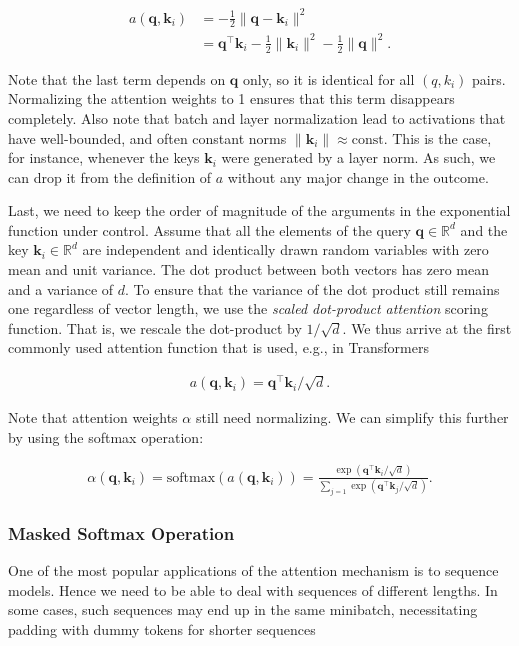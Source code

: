 \documentclass[a4paper,12pt]{article}
\theoremstyle{definition}
\begin{document}
\begin{align*}
    a(\mathbf{q}, \mathbf{k}_i) & = -\frac{1}{2} \|\mathbf{q} - \mathbf{k}_i\|^2                                                 \\
                                & = \mathbf{q}^\top \mathbf{k}_i -\frac{1}{2} \|\mathbf{k}_i\|^2  -\frac{1}{2} \|\mathbf{q}\|^2.
\end{align*}

Note that the last term depends on $\mathbf{q}$ only, so it is identical for all $(q,k_i)$ pairs. Normalizing the attention weights to 1 ensures that this term disappears completely.
Also note that batch and layer normalization lead to activations that have well-bounded, and often constant norms $\|\mathbf{k}_i\| \approx \mathrm{const}$. This is the case,
for instance, whenever the keys $\mathbf{k}_i$ were generated by a layer norm. As such, we can drop it from the definition of $a$ without any major change in the outcome.

Last, we need to keep the order of magnitude of the arguments in the exponential function under control. Assume that all the elements of the query $\mathbf{q} \in \mathbb{R}^d$
and the key $\mathbf{k}_i \in \mathbb{R}^d$ are independent and identically drawn random variables with zero mean and unit variance. The dot product between both vectors has
zero mean and a variance of $d$. To ensure that the variance of the dot product still remains one regardless of vector length, we use the \emph{scaled dot-product attention} scoring function.
That is, we rescale the dot-product by $1/\sqrt{d}$. We thus arrive at the first commonly used attention function that is used, e.g., in Transformers

\begin{align*}
    a(\mathbf{q}, \mathbf{k}_i) = \mathbf{q}^\top \mathbf{k}_i / \sqrt{d}.
\end{align*}

Note that attention weights $\alpha$ still need normalizing. We can simplify this further by using the softmax operation:

\begin{align*}
    \alpha(\mathbf{q}, \mathbf{k}_i) = \mathrm{softmax}(a(\mathbf{q}, \mathbf{k}_i)) = \frac{\exp(\mathbf{q}^\top \mathbf{k}_i / \sqrt{d})}{\sum_{j=1} \exp(\mathbf{q}^\top \mathbf{k}_j / \sqrt{d})}.
\end{align*}


\subsubsection*{Masked Softmax Operation}
One of the most popular applications of the attention mechanism is to sequence models. Hence we need to be able to deal with sequences of different lengths. In some cases,
such sequences may end up in the same minibatch, necessitating padding with dummy tokens for shorter sequences
\end{document}
